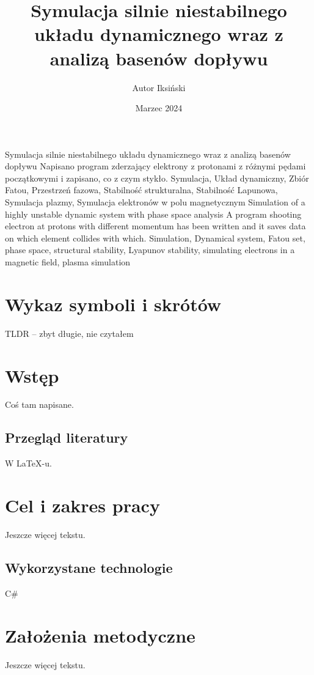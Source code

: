 \documentclass{SGGW-thesis}
\title{Symulacja silnie niestabilnego układu dynamicznego wraz z analizą basenów dopływu}
\author{Autor Iksiński}
\date{Marzec 2024}
\begin{document}
\maketitle
\statementpage
\abstractpage
{Symulacja silnie niestabilnego układu dynamicznego wraz z analizą basenów dopływu}
{Napisano program zderzający elektrony z protonami z różnymi pędami początkowymi i zapisano, co z czym stykło.}
{Symulacja, Układ dynamiczny, Zbiór Fatou, Przestrzeń fazowa, Stabilność strukturalna, Stabilność Lapunowa, Symulacja plazmy, Symulacja elektronów w polu magnetycznym}
{Simulation of a highly unstable dynamic system with phase space analysis}
{A program shooting electron at protons with different momentum has been written and it saves data on which element collides with which.}
{Simulation, Dynamical system, Fatou set, phase space, structural stability, Lyapunov stability, simulating electrons in a magnetic field, plasma simulation}

{
  \doublespacing
  \tableofcontents
}

\startchapterfromoddpage %

\chapter{Wykaz symboli i skrótów}
TLDR -- zbyt długie, nie czytałem

\chapter{Wstęp}
Coś tam napisane. 

\section{Przegląd literatury}
W \LaTeX-u.\cite{talbot2013}

\chapter{Cel i zakres pracy}
Jeszcze więcej tekstu.
\section{Wykorzystane technologie}
C\#

\chapter{Założenia metodyczne}
Jeszcze więcej tekstu.
\end{document}
